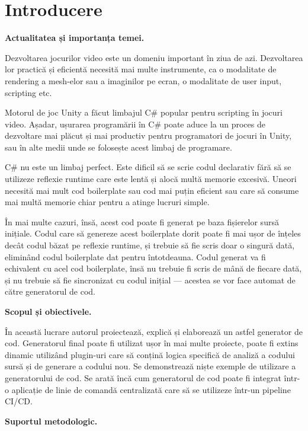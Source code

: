 \documentclass[a4paper,12pt]{report}
\begin{document}
\chapter*{Introducere}


\textbf{Actualitatea și importanța temei.}

Dezvoltarea jocurilor video este un domeniu important în ziua de azi.
Dezvoltarea lor practică și eficientă necesită mai multe instrumente, ca o modalitate de rendering a mesh-elor sau a imaginilor pe ecran, o modalitate de user input, scripting etc.

Motorul de joc Unity a făcut limbajul C\# popular pentru scripting în jocuri video.
Așadar, ușurarea programării în C\# poate aduce la un proces de dezvoltare mai plăcut și mai productiv pentru programatori de jocuri în Unity, sau în alte medii unde se folosește acest limbaj de programare.

C\# nu este un limbaj perfect.
Este dificil să se scrie codul declarativ fără să se utilizeze reflexie runtime care este lentă și alocă multă memorie excesivă.
Uneori necesită mai mult cod boilerplate sau cod mai puțin eficient sau care să consume mai multă memorie chiar pentru a atinge lucruri simple.

În mai multe cazuri, însă, acest cod poate fi generat pe baza fișierelor sursă inițiale.
Codul care să genereze acest boilerplate dorit poate fi mai ușor de înțeles decât codul băzat pe reflexie runtime, și trebuie să fie scris doar o singură dată, eliminând codul boilerplate dat pentru întotdeauna.
Codul generat va fi echivalent cu acel cod boilerplate, însă nu trebuie fi scris de mână de fiecare dată, și nu trebuie să fie sincronizat cu codul inițial — acestea se vor face automat de către generatorul de cod.


\textbf{Scopul și obiectivele.}

În această lucrare autorul proiectează, explică și elaborează un astfel generator de cod.
Generatorul final poate fi utilizat ușor în mai multe proiecte, poate fi extins dinamic utilizând plugin-uri care să conțină logica specifică de analiză a codului sursă și de generare a codului nou.
Se demonstrează niște exemple de utilizare a generatorului de cod.
Se arată încă cum generatorul de cod poate fi integrat într-o aplicație de linie de comandă centralizată care să se utilizeze într-un pipeline \ac{CI/CD}.

\textbf{Suportul metodologic.}
\end{document}

